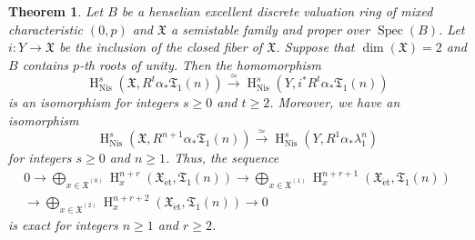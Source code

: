 \documentclass{article}
\newtheorem{thm}{\indent \sc Theorem}[section]
\newcommand{\spec}{\operatorname{Spec}}
\newcommand{\et}{\mathrm{\acute{e}t}}
\newcommand{\Nis}{\mathrm{Nis}}
\newcommand{\HO}{\operatorname{H}}
\begin{document}
%
\begin{thm}\upshape\label{Nisproper}
Let $B$ be a henselian excellent discrete valuation ring of mixed characteristic 
$(0, p)$
and $\mathfrak{X}$ a semistable family and proper over $\spec(B)$.
Let $i: Y\to \mathfrak{X}$ be the inclusion of 
the closed fiber of $\mathfrak{X}$.
Suppose that
$\operatorname{dim}(\mathfrak{X})=2$
and
$B$ contains $p$-th roots of unity.
Then the homomorphism
%
\begin{equation}\label{Nisis}
\HO^{s}_{\Nis}(\mathfrak{X}, 
R^{t}\alpha_{*}\mathfrak{T}_{1}(n)
)
\xrightarrow{\simeq}
\HO^{s}_{\Nis}(Y, 
i^{*}R^{t}\alpha_{*}\mathfrak{T}_{1}(n)
)
\end{equation}
%
is an isomorphism for integers $s\geq 0$ and $t\geq 2$. 
Moreover, we have an isomorphism
%
\begin{equation}\label{NisUr}
\HO^{s}_{\Nis}(\mathfrak{X}, 
R^{n+1}\alpha_{*}\mathfrak{T}_{1}(n)
)
\xrightarrow{\simeq}
\HO^{s}_{\Nis}
(Y, R^{1}\alpha_{*}\lambda_{1}^{n}
)
\end{equation}
%
for integers $s\geq 0$ and $n\geq 1$. Thus, the sequence
%
\begin{align}\label{NisHM}
0\to  
\displaystyle\bigoplus_{x\in \mathfrak{X}^{(0)}}
\HO_{x}^{n+r}(\mathfrak{X}_{\et}, \mathfrak{T}_{1}(n))
\to
\displaystyle\bigoplus_{x\in \mathfrak{X}^{(1)}}
\HO_{x}^{n+r+1}(\mathfrak{X}_{\et}, \mathfrak{T}_{1}(n))
\nonumber
\\
\to
\displaystyle\bigoplus_{x\in \mathfrak{X}^{(2)}}
\HO_{x}^{n+r+2}(\mathfrak{X}_{\et}, \mathfrak{T}_{1}(n))
\to
0
\end{align}
%
is exact for integers $n\geq 1$ and $r\geq 2$.
\end{thm}
%
\end{document}
